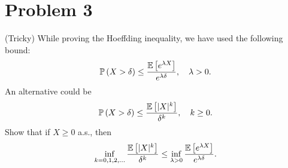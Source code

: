 \section*{Problem 3}
\begin{myanswerbox}
(Tricky) While proving the Hoeffding inequality, we have used the following bound:
\[ 
    \mathbb{P}\left(X > \delta\right) \leq \frac{\mathbb{E}\left[e^{\lambda X}\right]}{e^{\lambda \delta}}, \quad \lambda > 0. 
\]
An alternative could be
\[ \mathbb{P}\left(X > \delta\right) \leq \frac{\mathbb{E}\left[|X|^k\right]}{\delta^k}, \quad k \geq 0. \]
Show that if \( X \geq 0 \) a.s., then
\[ \inf_{k=0,1,2,\ldots} \frac{\mathbb{E}\left[|X|^k\right]}{\delta^k} \leq \inf_{\lambda>0} \frac{\mathbb{E}\left[e^{\lambda X}\right]}{e^{\lambda \delta}}. \]
\end{myanswerbox}

